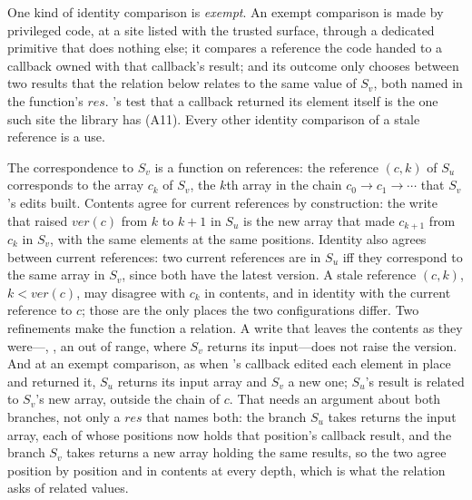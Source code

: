One kind of identity comparison is \emph{exempt}. An exempt comparison is made by privileged code, at a
site listed with the trusted surface, through a dedicated primitive that does nothing else; it compares a
reference the code handed to a callback owned with that callback's result; and its outcome only chooses
between two results that the relation below relates to the same value of $S_v$, both named in the
function's $\mathit{res}$. 's test that a callback returned its element itself is the one such
site the library has (A11). Every other identity comparison of a stale reference is a use.

The correspondence to $S_v$ is a function on references: the reference $(c, k)$ of $S_u$ corresponds to
the array $c_k$ of $S_v$, the $k$th array in the chain $c_0 \to c_1 \to \cdots$ that $S_v$'s edits
built. Contents agree for current references by construction: the write that raised $\mathit{ver}(c)$
from $k$ to $k+1$ in $S_u$ is the new array that made $c_{k+1}$ from $c_k$ in $S_v$, with the same
elements at the same positions. Identity also agrees between current references: two current references
are \code{===} in $S_u$ iff they correspond to the same array in $S_v$, since both have the latest
version. A stale reference $(c, k)$, $k < \mathit{ver}(c)$, may disagree with $c_k$ in contents, and in
identity with the current reference to $c$; those are the only places the two configurations differ.
Two refinements make the function a relation. A write that leaves the contents as they were---, , an  out of range, where $S_v$ returns its input---does not raise the
version. And at an exempt comparison, as when 's callback edited each element in place and
returned it, $S_u$ returns its input array and $S_v$ a new one; $S_u$'s result is related to $S_v$'s new
array, outside the chain of $c$. That needs an argument about both branches, not only a $\mathit{res}$
that names both: the branch $S_u$ takes returns the input array, each of whose positions now holds that
position's callback result, and the branch $S_v$ takes returns a new array holding the same results, so
the two agree position by position and in contents at every depth, which is what the relation asks of
related values.

